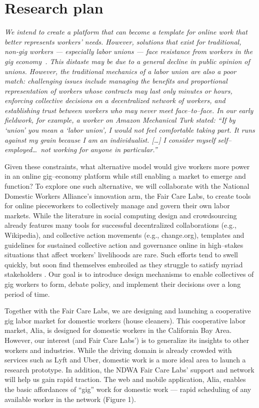 \documentclass{article}
\newenvironment{blah}{\par\color{Gray}\itshape}{\par}
\begin{document}
\section*{Research plan}
\begin{blah}
We intend to create a platform that can become a template for online work that better represents workers' needs.
However, solutions that exist for traditional, non-gig workers
--- especially labor unions ---
face resistance from workers in the gig economy~\cite{martin2014being,dynamo}.
This distaste may be due to a general decline in public opinion of unions.
However, the traditional mechanics of a labor union are also a poor match: challenging issues include managing the benefits and proportional representation of workers whose contracts may last only minutes or hours, enforcing collective decisions on a decentralized network of workers, and establishing trust between workers who may never meet face--to--face.
In our early fieldwork, for example, a worker on Amazon Mechanical Turk stated:
``If by `union' you mean a `labor union', I would not feel comfortable taking part.
It runs against my grain because I am an individualist.
[\dots] I consider myself self--employed\dots\  not working for anyone in particular.''

Given these constraints, what alternative model would give workers more power in an online gig--economy platform while still enabling a market to emerge and function? To explore one such alternative, we will collaborate with the National Domestic Workers Alliance's innovation arm, the Fair Care Labs, to create tools for online pieceworkers to collectively manage and govern their own labor markets.
While the literature in social computing design and crowdsourcing already features many tools for successful decentralized collaborations (e.g., Wikipedia), and collective action movements (e.g., change.org), templates and guidelines for sustained collective action and governance online in high--stakes situations that affect workers' livelihoods are rare.
Such efforts tend to swell quickly, but soon find themselves embroiled as they struggle to satisfy myriad stakeholders .
Our goal is to introduce design mechanisms to enable collectives of gig workers to form, debate policy, and implement their decisions over a long period of time.

Together with the Fair Care Labs, we are designing and launching a cooperative gig labor market for domestic workers (house cleaners).
This cooperative labor market, Alia, is designed for domestic workers in the California Bay Area.
However, our interest (and Fair Care Labs') is to generalize its insights to other workers and industries.
While the driving domain is already crowded with services such as Lyft and Uber, domestic work is a more ideal area to launch a research prototype.
In addition, the NDWA Fair Care Labs' support and network will help us gain rapid traction. The web and mobile application, Alia, enables the basic affordances of ``gig'' work for domestic work
--- rapid scheduling of any available worker in the network (Figure 1).
\end{blah}
\end{document}
